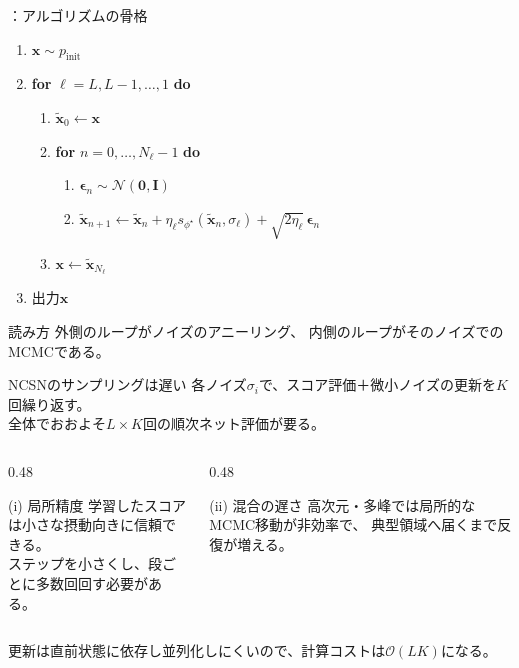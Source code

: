 \begin{frame}{\supplmark：アルゴリズムの骨格}
    \footnotesize
    \begin{enumerate}
        \item $\bm{x}\sim p_{\mathrm{init}}$
        \item \textbf{for} $\ell=L,L-1,\ldots,1$ \textbf{do}
        \begin{enumerate}
            \item $\tilde{\bm{x}}_0\leftarrow\bm{x}$
            \item \textbf{for} $n=0,\ldots,N_\ell-1$ \textbf{do}
            \begin{enumerate}
                \item $\bm{\epsilon}_n\sim\mathcal{N}(\bm{0},\bm{I})$
                \item
                $\tilde{\bm{x}}_{n+1}\leftarrow
                \tilde{\bm{x}}_n
                +\eta_\ell s_{\phi^\star}(\tilde{\bm{x}}_n,\sigma_\ell)
                +\sqrt{2\eta_\ell}\,\bm{\epsilon}_n$
            \end{enumerate}
            \item $\bm{x}\leftarrow\tilde{\bm{x}}_{N_\ell}$
        \end{enumerate}
        \item 出力$\bm{x}$
    \end{enumerate}
    \normalsize
    \begin{exampleblock}{読み方}
        外側のループがノイズのアニーリング、
        内側のループがそのノイズでのMCMCである。
    \end{exampleblock}
\end{frame}
\asmain
\begin{frame}{NCSNのサンプリングは遅い}
    各ノイズ$\sigma_i$で、スコア評価＋微小ノイズの更新を$K$回繰り返す。\\
    全体でおおよそ$L\times K$回の順次ネット評価が要る。
    \begin{columns}[T,onlytextwidth]
        \begin{column}{0.48\textwidth}
            \begin{block}{(i) 局所精度}
                学習したスコアは小さな摂動向きに信頼できる。\\
                ステップを小さくし、段ごとに多数回回す必要がある。
            \end{block}
        \end{column}
        \begin{column}{0.48\textwidth}
            \begin{block}{(ii) 混合の遅さ}
                高次元・多峰では局所的なMCMC移動が非効率で、
                典型領域へ届くまで反復が増える。
            \end{block}
        \end{column}
    \end{columns}
    \vfill
    更新は直前状態に依存し並列化しにくいので、計算コストは$\mathcal{O}(LK)$になる。
\end{frame}
